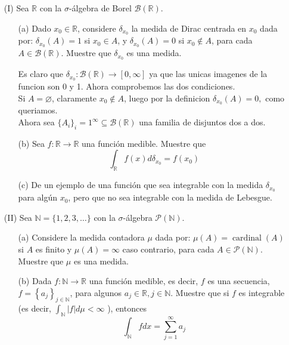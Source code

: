  \begin{itemize}
  
\item[(I)] Sea $\mathbb{R}$ con la $\sigma$-álgebra de Borel $\mathcal{B}(\mathbb{R})$.
\begin{itemize}
\item[(a)] Dado $x_0 \in \mathbb{R}$, considere $\delta_{x_0}$ la medida de Dirac centrada en $x_0$ dada por: $\delta_{x_0}(A)=1$ si $x_0 \in A$, y $\delta_{x_0}(A)=0$ si $x_0 \notin A$, para cada $A \in \mathcal{B}(\mathbb{R})$. Muestre que $\delta_{x_0}$ es una medida.
\begin{sproof}
    Es claro que $\delta_{x_0}:\mathcal{B}(\mathbb{R})\to [0,\infty]$ ya que las unicas imagenes de la funcion son 0 y 1. Ahora comprobemos las dos condiciones.\\

    Si $A=\varnothing$, claramente $x_0\notin A$, luego por la definicion $\delta_{x_0}(A)=0,$ como queriamos.\\

    Ahora sea $\{A_i\}_i=1^\infty\subseteq \mathcal{B}(\mathbb{R})$ una familia de disjuntos dos a dos.  
\end{sproof}
\item[(b)] Sea $f: \mathbb{R} \rightarrow \mathbb{R}$ una función medible. Muestre que
$$
\int_{\mathbb{R}} f(x) d \delta_{x_0}=f\left(x_0\right)
$$
\item[(c)] De un ejemplo de una función que sea integrable con la medida $\delta_{x_0}$ para algún $x_0$, pero que no sea integrable con la medida de Lebesgue.
\end{itemize}
\item[(II)] Sea $\mathbb{N}=\{1,2,3, \ldots\}$ con la $\sigma$-álgebra $\mathcal{P}(\mathbb{N})$.
\begin{itemize}
  

\item[(a)] Considere la medida contadora $\mu$ dada por: $\mu(A)=\operatorname{cardinal}(A)$ si $A$ es finito y $\mu(A)=\infty$ caso contrario, para cada $A \in \mathcal{P}(\mathbb{N})$. Muestre que $\mu$ es una medida.
\item[(b)] Dada $f: \mathbb{N} \rightarrow \mathbb{R}$ una función medible, es decir, $f$ es una secuencia, $f=\left\{a_j\right\}_{j \in \mathbb{N}}$, para algunos $a_j \in \mathbb{R}, j \in \mathbb{N}$. Muestre que si $f$ es integrable (es decir, $\int_{\mathbb{N}}|f| d \mu<\infty$ ), entonces
$$
\int_{\mathbb{N}} f d x=\sum_{j=1}^{\infty} a_j
$$
\end{itemize}
\end{itemize}